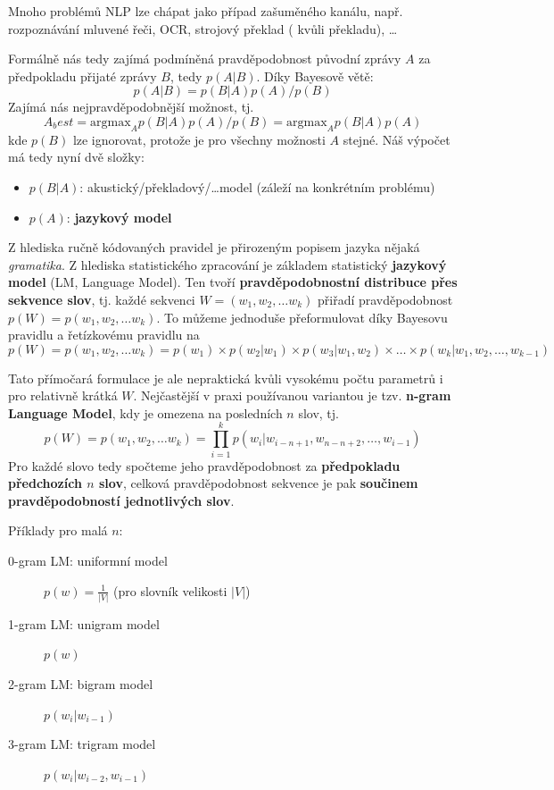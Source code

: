 \documentclass[11pt]{report} %
\numberwithin{equation}{section}
\begin{document}
Mnoho problémů NLP lze chápat jako případ zašuměného kanálu, např. rozpoznávání mluvené řeči, OCR, strojový překlad ( kvůli překladu), \dots

Formálně nás tedy zajímá podmíněná pravděpodobnost původní zprávy $A$ za předpokladu přijaté zprávy $B$, tedy $p(A|B)$. Díky Bayesově větě:
$$p(A|B) = p(B|A)p(A)/p(B)$$
Zajímá nás nejpravděpodobnější možnost, tj.
$$A_best = \text{argmax}_A p(B|A)p(A)/p(B) =\text{argmax}_A p(B|A)p(A)$$
kde $p(B)$ lze ignorovat, protože je pro všechny možnosti $A$ stejné. Náš výpočet má tedy nyní dvě složky:
\begin{itemize}
	
	
	\item $p(B|A)$: akustický/překladový/\dots model (záleží na konkrétním problému)
	\item $p(A)$: \textbf{jazykový model}
\end{itemize}
 
Z hlediska ručně kódovaných pravidel je přirozeným popisem jazyka nějaká \textit{gramatika}. Z hlediska statistického zpracování je základem statistický \textbf{jazykový model} (LM, Language Model). Ten tvoří \textbf{pravděpodobnostní distribuce přes sekvence slov}, tj. každé sekvenci $W = (w_1, w_2, \dots w_k)$ přiřadí pravděpodobnost $p(W) = p(w_1,w_2,\dots w_k)$. To můžeme jednoduše přeformulovat díky Bayesovu pravidlu a řetízkovému pravidlu na 
$$p(W) = p(w_1,w_2,\dots w_k) = p(w_1) \times p(w_2|w_1) \times p(w_3|w_1,w_2) \times \dots \times p(w_k|w_1,w_2,\dots,w_{k-1})$$

Tato přímočará formulace je ale nepraktická kvůli vysokému počtu parametrů i pro relativně krátká $W$. Nejčastější v praxi používanou variantou je tzv. \textbf{n-gram Language Model}, kdy je  omezena na posledních $n$ slov, tj.
$$p(W) = p(w_1,w_2,\dots w_k) = \prod\limits_{i = 1}^{k} p(w_i|w_{i-n+1}, w_{n-n+2},\dots,w_{i-1})$$
Pro každé slovo tedy spočteme jeho pravděpodobnost za \textbf{předpokladu předchozích $n$ slov}, celková pravděpodobnost sekvence je pak \textbf{součinem pravděpodobností jednotlivých slov}.

Příklady pro malá $n$:
\begin{description}
	
	
	\item[0-gram LM: uniformní model] 	\quad $p(w) = \frac{1}{|V|}$  (pro slovník velikosti $|V|$)
	\item[1-gram LM: unigram model] 	\quad $p(w)$
	\item[2-gram LM: bigram model] 		\quad $p(w_i|w_{i-1})$
	\item[3-gram LM: trigram model] 	\quad $p(w_i|w_{i-2},w_{i-1})$
\end{description}
\end{document}
